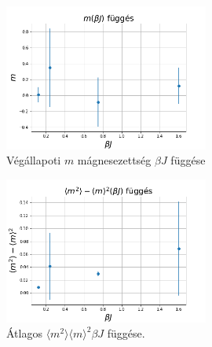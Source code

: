 \documentclass[a4paper, 12pt]{article}
\numberwithin{equation}{section}          %
\numberwithin{figure}{subsection}
\begin{document}
\begin{figure}[h!]
	\begin{center}
		\includegraphics[width=0.6\textwidth]{mm.png}
	\end{center}
	\caption{Végállapoti $m$ mágnesezettség $\beta J$ függése}
	\label{mm}
\end{figure}

\begin{figure}[h!]
	\begin{center}
		\includegraphics[width=0.6\textwidth]{szorasnegyzet.png}
	\end{center}
	\caption{Átlagos $\langle m^2 \rangle  \langle m\rangle^2 \beta J$ függése.}
	\label{szor}
\end{figure}
\end{document}
